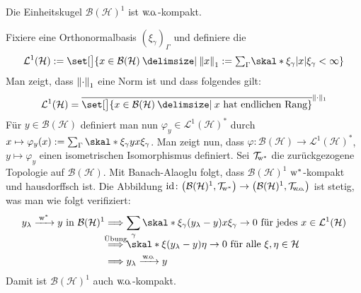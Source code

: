 \begin{satz}[{name=[Einheitskugel der beschränkten Operatoren ist schwach kompakt]}]
	Die Einheitskugel $\mathcal{B}(\mathcal{H})^1$ ist $\wo$-kompakt.
\end{satz}
\begin{beweis}[name={Skizze}]
	Fixiere eine Orthonormalbasis $(\xi_\gamma)_\Gamma$ und definiere die \href{https://de.wikipedia.org/wiki/Spurklasseoperator}{}
	\[
		\mathcal{L}^1(\mathcal{H}) := \set[\big]{x \in \mathcal{B}(\mathcal{H}) \given \norm*{x}_1 := {\textstyle\sum\nolimits_\Gamma} \skal*{\xi_\gamma}{\abs*{x} \xi_\gamma } < \infty} 
	\]
	Man zeigt, dass $\norm*{\cdot}_1$ eine Norm ist und dass folgendes gilt:
	\[
		\mathcal{L}^1(\mathcal{H}) = \overline{\set[\big]{x \in \mathcal{B}(\mathcal{H}) \given x \text{ hat endlichen Rang} }}^{\norm{\cdot }_1}
	\]
	Für $y \in \mathcal{B}(\mathcal{H})$ definiert man nun $\varphi_y \in \mathcal{L}^1(\mathcal{H})^*$ durch $x \mapsto \varphi_y(x) := \sum_\Gamma \skal*{\xi_\gamma}{yx \xi_\gamma}$.
	Man zeigt nun, dass $\varphi \colon \mathcal{B}(\mathcal{H}) \to \mathcal{L}^1(\mathcal{H})^*$, $y \mapsto \varphi_y$ einen isometrischen Isomorphismus definiert. 
	Sei $\TWeakStar$ die zurückgezogene Topologie auf $\mathcal{B}(\mathcal{H})$.
	Mit Banach-Alaoglu folgt, dass $\mathcal{B}(\mathcal{H})^1$ $\w^*$-kompakt und hausdorffsch ist.
	Die Abbildung $\id \colon \enbrace*{\mathcal{B}(\mathcal{H})^1, \TWeakStar} \to \enbrace*{\mathcal{B}(\mathcal{H})^1,\TWeakOp}$ ist stetig, was man wie folgt verifiziert: 
	\begin{align}
		y_\lambda \grenzw{\w^*} y \text{ in } \mathcal{B}(\mathcal{H})^1 &\Longrightarrow \sum_{\gamma} \skal*{\xi_\gamma}{(y_\lambda-y)x \xi_\gamma} \to 0 \text{ für jedes } x \in \mathcal{L}^1(\mathcal{H}) \\[-.9em]
		&\StackTextClap{Übung}{\Longrightarrow} \skal*{\xi}{(y_\lambda-y) \eta} \to 0 \text{ für alle } \xi,\eta \in \mathcal{H} \\
		&\Longrightarrow y_\lambda \grenzw{\wo} y 
	\end{align}
	Damit ist $\mathcal{B}(\mathcal{H})^1$ auch $\wo$-kompakt.
\end{beweis}

